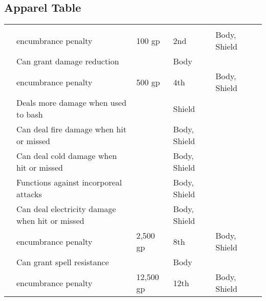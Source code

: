         \onecolumn

    \subsection{Apparel Table}

        \begin{longtabuwrapper}
            \begin{longtabu}{l X l l l l}
                 &  &  &  &  &  \\
                  &  encumbrance penalty & 100 gp & 2nd & Body, Shield &  \\
                 & Can grant damage reduction &  & Body &  \\
                  &  encumbrance penalty & 500 gp & 4th & Body, Shield &  \\
                 & Deals more damage when used to bash &  & Shield &  \\
                 & Can deal fire damage when hit or missed &  & Body, Shield &  \\
                 & Can deal cold damage when hit or missed &  & Body, Shield &  \\
                 & Functions against incorporeal attacks &  & Body, Shield &  \\
                 & Can deal electricity damage when hit or missed &  & Body, Shield &  \\
                  &  encumbrance penalty & 2,500 gp & 8th & Body, Shield &  \\
                 & Can grant spell resistance &  & Body &  \\
                  &  encumbrance penalty & 12,500 gp & 12th & Body, Shield &  \\

\end{longtabu}
\end{longtabuwrapper}
